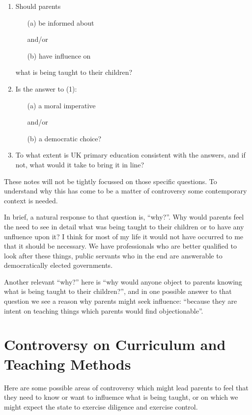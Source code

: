 \documentclass[10pt,titlepage]{article}
\begin{document}
\begin{enumerate}
\item Should parents
  \begin{itemize}
  \item[(a)] be informed about

    and/or
  \item[(b)] have influence on
    \end{itemize}
what is being taught to their children?

\item Is the answer to (1):
  \begin{itemize}
  \item[(a)] a moral imperative

    and/or
    \item[(b)] a democratic choice?
  \end{itemize}
\item To what extent is UK primary education consistent with the answers,
and if not, what would it take to bring it in line?
\end{enumerate}

These notes will not be tightly focussed on those specific questions.
To understand why this has come to be a matter of controversy some contemporary context is needed.

In brief, a natural response to that question is, ``why?''.
Why would parents feel the need to see in detail what was being taught to their children or to have any unfluence upon it?
I think for most of my life it would not have occurred to me that it should be necessary.
We have professionals who are better qualified to look after these things, public servants who in the end are answerable to democratically elected governments.

Another relevant ``why?'' here is ``why would anyone object to parents knowing what is being taught to their children?'', and in one possible answer to that question we see a reason why parents might seek influence: ``because they are intent on teaching things which parents would find objectionable''.


\section{Controversy on Curriculum and Teaching Methods}

Here are some possible areas of controversy which might lead parents to feel that they need to know or want to influemce what is being taught, or on which we might expect the state to exercise diligence and exercise control.
\end{document}
